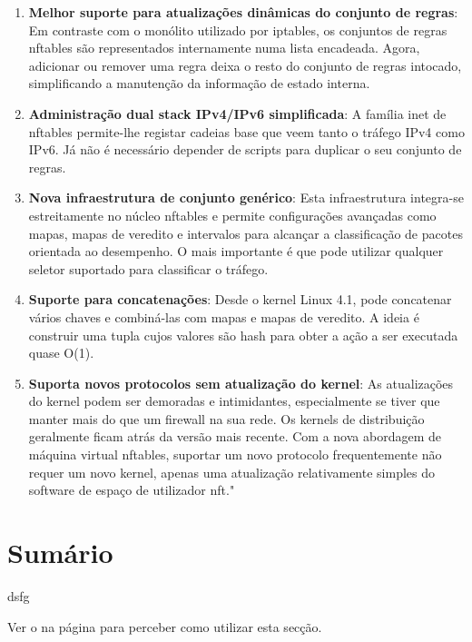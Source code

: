 \begin{enumerate}
\item \textbf{Melhor suporte para atualizações dinâmicas do conjunto de regras}: Em 
contraste com o monólito utilizado por iptables, os conjuntos de regras nftables são 
representados internamente numa lista encadeada. Agora, adicionar ou remover uma regra 
deixa o resto do conjunto de regras intocado, simplificando a manutenção da informação 
de estado interna.

\item \textbf{Administração dual stack IPv4/IPv6 simplificada}: A família inet de 
nftables permite-lhe registar cadeias base que veem tanto o tráfego IPv4 como IPv6. 
Já não é necessário depender de scripts para duplicar o seu conjunto de regras.

\item \textbf{Nova infraestrutura de conjunto genérico}: Esta infraestrutura integra-se 
estreitamente no núcleo nftables e permite configurações avançadas como mapas, mapas 
de veredito e intervalos para alcançar a classificação de pacotes orientada ao desempenho. O mais importante é que pode utilizar qualquer seletor suportado para classificar o tráfego.

\item \textbf{Suporte para concatenações}: Desde o kernel Linux 4.1, pode concatenar 
vários chaves e combiná-las com mapas e mapas de veredito. A ideia é construir uma tupla 
cujos valores são hash para obter a ação a ser executada quase O(1).

\item \textbf{Suporta novos protocolos sem atualização do kernel}: As atualizações do 
kernel podem ser demoradas e intimidantes, especialmente se tiver que manter mais do 
que um firewall na sua rede. Os kernels de distribuição geralmente ficam atrás da 
versão mais recente. Com a nova abordagem de máquina virtual nftables, suportar 
um novo protocolo frequentemente não requer um novo kernel, apenas uma atualização 
relativamente simples do software de espaço de utilizador nft."
\end{enumerate}


\section*{Sumário}

dsfg

Ver o  na página \pageref{sec:intro_summary} para perceber como utilizar esta secção.
